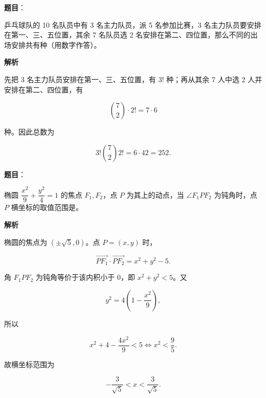 \begin{answer}

\textbf{题目}：

乒乓球队的 10 名队员中有 3 名主力队员，派 5 名参加比赛，3 名主力队员要安排在第一、三、五位置，其余 7 名队员选 2 名安排在第二、四位置，那么不同的出场安排共有\gkblank{}种（用数字作答）。

\textbf{解析}

先把 3 名主力队员安排在第一、三、五位置，有 $3!$ 种；再从其余 7 人中选 2 人并安排在第二、四位置，有

\nopagebreak[4]
\[
\binom72\cdot2!=7\cdot6
\]

种。因此总数为

\nopagebreak[4]
\[
3!\binom72 2!=6\cdot42=252.
\]


\end{answer}
\begin{answer}

\textbf{题目}：

椭圆 $\dfrac{x^2}{9}+\dfrac{y^2}{4}=1$ 的焦点 $F_1,F_2$，点 $P$ 为其上的动点，当 $\angle F_1PF_2$ 为钝角时，点 $P$ 横坐标的取值范围是\gkblank{}。

\textbf{解析}

椭圆的焦点为 $(\pm\sqrt5,0)$。点 $P=(x,y)$ 时，

\nopagebreak[4]
\[
\overrightarrow{PF_1}\cdot\overrightarrow{PF_2}
=x^2+y^2-5.
\]

角 $F_1PF_2$ 为钝角等价于该内积小于 $0$，即 $x^2+y^2<5$。又

\nopagebreak[4]
\[
y^2=4\left(1-\frac{x^2}{9}\right),
\]

所以

\nopagebreak[4]
\[
x^2+4-\frac{4x^2}{9}<5
\Longleftrightarrow
x^2<\frac95.
\]

故横坐标范围为

\nopagebreak[4]
\[
-\frac3{\sqrt5}<x<\frac3{\sqrt5}.
\]


\end{answer}
